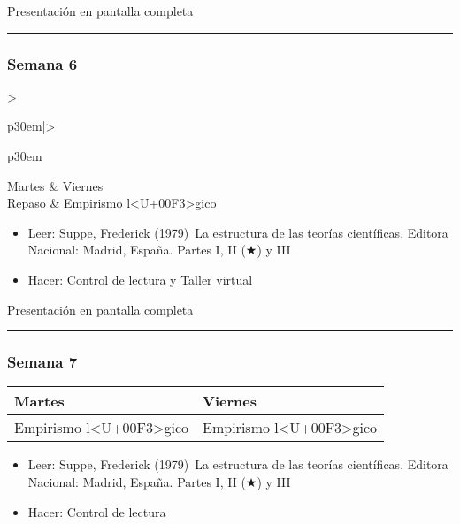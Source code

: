 \documentclass[spanish,]{article}
\begin{document}
Presentación en pantalla completa

\begin{center}\rule{0.5\linewidth}{\linethickness}\end{center}

\subsubsection{Semana 6}\label{semana-6}

\begin{tabular}{>{\raggedright\arraybackslash}p{30em}|>{\raggedright\arraybackslash}p{30em}}
\hline
Martes & Viernes\\
\hline
Repaso & Empirismo l<U+00F3>gico\\
\hline
\end{tabular}

\begin{itemize}
\item
  Leer: Suppe, Frederick (1979)~La estructura de las teorías
  científicas. Editora Nacional: Madrid, España. Partes I, II (★) y III
\item
  Hacer: Control de lectura y Taller virtual
\end{itemize}

Presentación en pantalla completa

\begin{center}\rule{0.5\linewidth}{\linethickness}\end{center}

\subsubsection{Semana 7}\label{semana-7}

\begin{tabular}{>{\raggedright\arraybackslash}p{30em}|>{\raggedright\arraybackslash}p{30em}}
\hline
Martes & Viernes\\
\hline
Empirismo l<U+00F3>gico & Empirismo l<U+00F3>gico\\
\hline
\end{tabular}

\begin{itemize}
\item
  Leer: Suppe, Frederick (1979)~La estructura de las teorías
  científicas. Editora Nacional: Madrid, España. Partes I, II (★) y III
\item
  Hacer: Control de lectura
\end{itemize}
\end{document}
